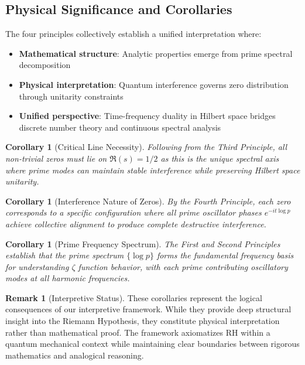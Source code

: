 \documentclass[12pt]{article}
\theoremstyle{plain}
\newtheorem{corollary}[theorem]{Corollary}
\theoremstyle{definition}
\newtheorem{remark}[theorem]{Remark}
\begin{document}
\subsection{Physical Significance and Corollaries}

The four principles collectively establish a unified interpretation where:
\begin{itemize}
\item \textbf{Mathematical structure}: Analytic properties emerge from prime spectral decomposition
\item \textbf{Physical interpretation}: Quantum interference governs zero distribution through unitarity constraints
\item \textbf{Unified perspective}: Time-frequency duality in Hilbert space bridges discrete number theory and continuous spectral analysis
\end{itemize}

\begin{corollary}[Critical Line Necessity]
Following from the Third Principle, all non-trivial zeros must lie on $\Re(s) = 1/2$ as this is the unique spectral axis where prime modes can maintain stable interference while preserving Hilbert space unitarity.
\end{corollary}

\begin{corollary}[Interference Nature of Zeros]
By the Fourth Principle, each zero corresponds to a specific configuration where all prime oscillator phases $e^{-it\log p}$ achieve collective alignment to produce complete destructive interference.
\end{corollary}

\begin{corollary}[Prime Frequency Spectrum]
The First and Second Principles establish that the prime spectrum $\{\log p\}$ forms the fundamental frequency basis for understanding $\zeta$ function behavior, with each prime contributing oscillatory modes at all harmonic frequencies.
\end{corollary}

\begin{remark}[Interpretive Status]
These corollaries represent the logical consequences of our interpretive framework. While they provide deep structural insight into the Riemann Hypothesis, they constitute physical interpretation rather than mathematical proof. The framework axiomatizes RH within a quantum mechanical context while maintaining clear boundaries between rigorous mathematics and analogical reasoning.
\end{remark}
\end{document}
